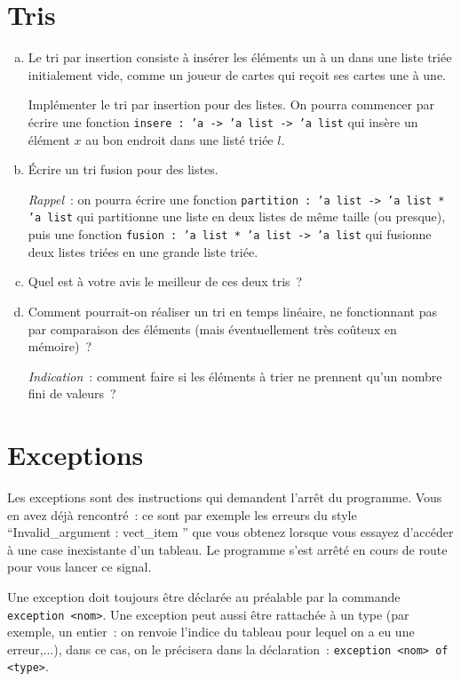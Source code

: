 \documentclass[10pt,a4paper]{article}
\begin{document}
\section{Tris}
\begin{enumerate}[a)]
\item Le tri par insertion consiste à insérer les éléments un à un dans une liste triée initialement vide, comme un joueur de cartes qui reçoit ses cartes une à une.

Implémenter le tri par insertion pour des listes. On pourra commencer par écrire une fonction \texttt{insere : ’a -> ’a list -> ’a list} qui insère un élément $x$ au bon endroit dans une listé triée $l$.

\item Écrire un tri fusion pour des listes.

\textit{Rappel}~: on pourra écrire une fonction \texttt{partition : ’a list -> ’a list * ’a list} qui partitionne une liste en deux listes de même taille (ou presque), puis une fonction \texttt{fusion : ’a list * ’a list -> ’a list} qui fusionne deux listes triées en une grande liste triée.

\item Quel est à votre avis le meilleur de ces deux tris~?

\item Comment pourrait-on réaliser un tri en temps linéaire, ne fonctionnant pas par comparaison des éléments (mais éventuellement très coûteux en mémoire)~?

\textit{Indication}~: comment faire si les éléments à trier ne prennent qu'un nombre fini de valeurs~?
\end{enumerate}

\section{Exceptions}
Les exceptions sont des instructions qui demandent l'arrêt du programme. Vous en avez déjà rencontré~: ce sont par exemple les erreurs du style ``Invalid\_argument : vect\_item '' que vous obtenez lorsque vous essayez d'accéder à une case inexistante d'un tableau. Le programme s'est arrêté en cours de route pour vous lancer ce signal.

Une exception doit toujours être déclarée au préalable par la commande \texttt{exception <nom>}. Une exception peut aussi être rattachée à un type (par exemple, un entier~: on renvoie l'indice du tableau pour lequel on a eu une erreur,...), dans ce cas, on le précisera dans la déclaration~: \texttt{exception <nom> of <type>}.
\end{document}
